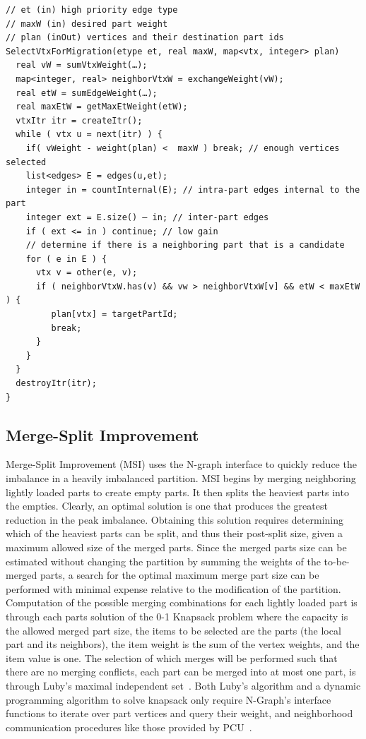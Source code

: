 \documentclass[12pt]{article}
\begin{document}
\begin{verbatim}
// et (in) high priority edge type
// maxW (in) desired part weight
// plan (inOut) vertices and their destination part ids
SelectVtxForMigration(etype et, real maxW, map<vtx, integer> plan) 
  real vW = sumVtxWeight(…);
  map<integer, real> neighborVtxW = exchangeWeight(vW);
  real etW = sumEdgeWeight(…);
  real maxEtW = getMaxEtWeight(etW);
  vtxItr itr = createItr();
  while ( vtx u = next(itr) ) {
    if( vWeight - weight(plan) <  maxW ) break; // enough vertices selected
    list<edges> E = edges(u,et);
    integer in = countInternal(E); // intra-part edges internal to the part
    integer ext = E.size() – in; // inter-part edges
    if ( ext <= in ) continue; // low gain 
    // determine if there is a neighboring part that is a candidate
    for ( e in E ) {
      vtx v = other(e, v);
      if ( neighborVtxW.has(v) && vw > neighborVtxW[v] && etW < maxEtW ) {
         plan[vtx] = targetPartId;
         break;
      }
    }
  }
  destroyItr(itr);
}
\end{verbatim}

\subsection{Merge-Split Improvement} \label{sec:msi}

Merge-Split Improvement (MSI) uses the N-graph interface to quickly reduce the
imbalance in a heavily imbalanced partition.
MSI begins by merging neighboring lightly loaded parts to create empty parts.
It then splits the heaviest parts into the empties. Clearly, an optimal
solution is one that produces the greatest reduction in the peak imbalance.
Obtaining this solution requires determining which of the heaviest parts can be
split, and thus their post-split size, given a maximum allowed size of the
merged parts.
Since the merged parts size can be estimated without changing the partition by
summing the weights of the to-be-merged parts, a search for the optimal maximum
merge part size can be performed with minimal expense relative to the
modification of the partition.
Computation of the possible merging combinations for each lightly loaded part
is through each parts solution of the 0-1 Knapsack problem where the capacity
is the allowed merged part size, the items to be selected are the parts (the
local part and its neighbors), the item weight is the sum of the vertex
weights, and the item value is one.
The selection of which merges will be performed such that there are no merging
conflicts, each part can be merged into at most one part, is through Luby’s
maximal independent set~\cite{luby1985simple}.
Both Luby’s algorithm and a dynamic programming algorithm to solve knapsack
only require N-Graph’s interface functions to iterate over part vertices and
query their weight, and neighborhood communication procedures like those
provided by PCU~\cite{ibanez2014hybrid}.
\end{document}
